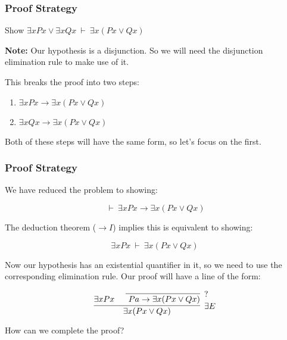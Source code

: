 \documentclass{beamer}
\theoremstyle{indentDefn} \newtheorem{defn}[]{Definition}
\begin{document}
\begin{frame}
	\frametitle{Proof Strategy}
	
	\begin{center}
	Show $\exists x Px \lor \exists x Qx \ \vdash \ \exists x (Px \lor Qx)$
	\end{center}

	{\bf Note:} Our hypothesis is a disjunction. So we will need the disjunction elimination rule to make use of it. 
	
	\vspace{2cm}
	
	This breaks the proof into two steps: 
	
	\begin{center}
	\begin{enumerate}
		\item $\exists x Px \rightarrow \exists x (Px \lor Qx)$
		\item $\exists x Qx \rightarrow \exists x (Px \lor Qx)$		
	\end{enumerate}
	\end{center}
	
	Both of these steps will have the same form, so let's focus on the first.
		
\end{frame}

\begin{frame}
	\frametitle{Proof Strategy}

	We have reduced the problem to showing:	

	 $$ \ \vdash \ \exists x Px \rightarrow \exists x (Px \lor Qx)$$
	
	\pause
	
	The deduction theorem ($\rightarrow I$) implies this is equivalent to showing:
	
	$$\exists x Px \ \vdash \  \exists x (Px \lor Qx)$$
	
	\pause
	
	Now our hypothesis has an existential quantifier in it, so we need to use the corresponding elimination rule. Our proof will have a line of the form: 
	
	\vspace{0.7cm}
	
	$$ \infer[\exists E]{\exists x (Px \lor Qx)}{\exists x Px \ & \infer[?]{\ Pa \rightarrow \exists x (Px \lor Qx)}{} } $$

	How can we complete the proof? 
		
\end{frame}
\end{document}
